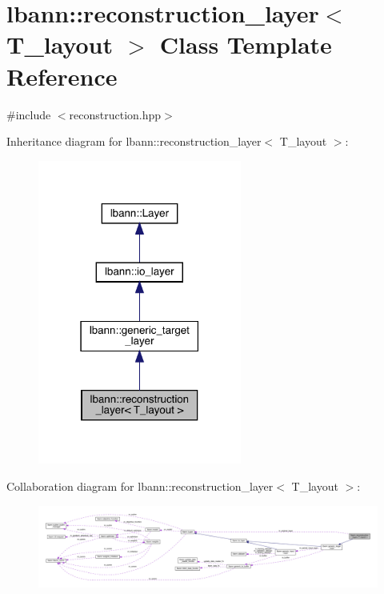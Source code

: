 \hypertarget{classlbann_1_1reconstruction__layer}{}\section{lbann\+:\+:reconstruction\+\_\+layer$<$ T\+\_\+layout $>$ Class Template Reference}
\label{classlbann_1_1reconstruction__layer}


{\ttfamily \#include $<$reconstruction.\+hpp$>$}



Inheritance diagram for lbann\+:\+:reconstruction\+\_\+layer$<$ T\+\_\+layout $>$\+:\nopagebreak
\begin{figure}[H]
\begin{center}
\leavevmode
\includegraphics[width=190pt]{classlbann_1_1reconstruction__layer__inherit__graph}
\end{center}
\end{figure}


Collaboration diagram for lbann\+:\+:reconstruction\+\_\+layer$<$ T\+\_\+layout $>$\+:\nopagebreak
\begin{figure}[H]
\begin{center}
\leavevmode
\includegraphics[width=350pt]{classlbann_1_1reconstruction__layer__coll__graph}
\end{center}
\end{figure}

